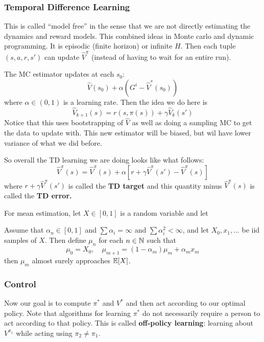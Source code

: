 \documentclass[12pt]{article}
\begin{document}
\subsubsection{Temporal Difference Learning}
This is called ``model free'' in the sense that we are not directly estimating the dynamics and reward models. This combined ideas in Monte carlo and dynamic programming.
It is episodic (finite horizon) or infinite $H$. Then each tuple $(s,a,r,s')$ can update $\hat V^\pi$ (instead of having to wait for an entire run).

The MC estimator updates at each $s_0$:
\[\hat V(s_0)+\alpha(G^i-\hat V^\ast(s_0))\]
where $\alpha\in(0,1)$ is a learning rate. Then the idea we do here is 
\[\hat V_{k+1}(s)=r(s,\pi(s))+\gamma\hat V_k(s')\]
Notice that this uses bootstrapping  of $\hat V$ as well as doing a sampling MC to get the data to update with.
This new estimator will be biased, but wil have lower variance of what we did before.

So overall the TD learning we are doing looks like what follows:
\[\hat V^\pi(s)=\hat V^\pi(s)+\alpha\left[r+\gamma\hat V^\pi(s')-\hat V^\pi(s)\right]\]
where $r+\gamma\hat V^\pi(s')$ is called the \textbf{TD target} and this quantity minus $\hat V^\pi(s)$ is called the \textbf{TD error.}

For mean estimation, let $X\in[0,1]$ is a random variable and let 
\begin{thm}
	Assume that $\alpha_n\in[0,1]$ and $\sum \alpha_i=\infty$ and $\sum \alpha_i^2<\infty$, and let $X_0,x_1,\dots$ be iid samples of $X$. Then define $\mu_n$ for each $n\in\mathbb{N}$ such that 
	\[\mu_0=X_0,\quad \mu_{m+1}=(1-\alpha_m)\mu_m+\alpha_mx_m\]
	then $\mu_m$ almost surely approaches $\mathbb{E}[X]$.
\end{thm}


\subsubsection{Control}
Now our goal is to compute $\pi^\ast$ and $V^\ast$ and then act according to our optimal policy. Note that algorithms for learning $\pi^\ast$ do not necessarily require a person to act according to that policy.
This is called \textbf{off-policy learning}: learning about $V^{\pi_1}$ while acting using $\pi_2\ne\pi_1$.
\end{document}
